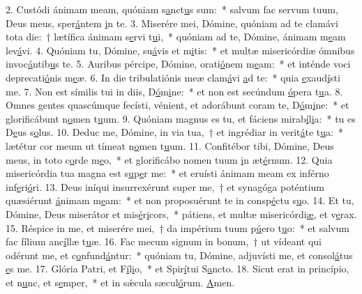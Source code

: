 2. Custódi ánimam meam, quóniam s\uline{a}nct\uline{u}s sum:~* salvum fac servum tuum, Deus meus, sper\uline{á}ntem \uline{i}n te.
3. Miserére mei, Dómine, quóniam ad te clamávi tota die:~† lætífica ánimam s\uline{e}rvi t\uline{u}i,~* quóniam ad te, Dómine, ánimam m\uline{e}am lev\uline{á}vi.
4. Quóniam tu, Dómine, su\uline{á}vis et m\uline{i}tis:~* et multæ misericórdiæ ómnibus invoc\uline{á}ntib\uline{u}s te.
5. Auribus pércipe, Dómine, orati\uline{ó}nem m\uline{e}am:~* et inténde voci deprecati\uline{ó}nis m\uline{e}æ.
6. In die tribulatiónis meæ clam\uline{á}vi \uline{a}d te:~* quia \uline{e}xaud\uline{í}sti me.
7. Non est símilis tui in diis, D\uline{ó}m\uline{i}ne:~* et non est secúndum \uline{ó}pera t\uline{u}a.
8. Omnes gentes quascúmque fecísti, vénient, et adorábunt coram te, D\uline{ó}m\uline{i}ne:~* et glorificábunt n\uline{o}men t\uline{u}um.
9. Quóniam magnus es tu, et fáciens mirab\uline{í}l\uline{i}a:~* tu es D\uline{e}us s\uline{o}lus.
10. Deduc me, Dómine, in via tua,~† et ingrédiar in verit\uline{á}te t\uline{u}a:~* lætétur cor meum ut tímeat n\uline{o}men t\uline{u}um.
11. Confitébor tibi, Dómine, Deus meus, in toto c\uline{o}rde m\uline{e}o,~* et glorificábo nomen tuum \uline{i}n æt\uline{é}rnum.
12. Quia misericórdia tua magna est s\uline{u}p\uline{e}r me:~* et eruísti ánimam meam ex inférno inf\uline{e}ri\uline{ó}ri.
13. Deus iníqui insurrexérunt super me,~† et synagóga poténtium quæsiérunt \uline{á}nimam m\uline{e}am:~* et non proposuérunt te in consp\uline{é}ctu s\uline{u}o.
14. Et tu, Dómine, Deus miserátor et mis\uline{é}r\uline{i}cors,~* pátiens, et multæ misericórdi\uline{æ}, et v\uline{e}rax.
15. Réspice in me, et miserére mei,~† da impérium tuum p\uline{ú}ero t\uline{u}o:~* et salvum fac fílium anc\uline{í}llæ t\uline{u}æ.
16. Fac mecum signum in bonum,~† ut vídeant qui odérunt me, et c\uline{o}nfund\uline{á}ntur:~* quóniam tu, Dómine, adjuvísti me, et consol\uline{á}tus \uline{e}s me.
17. Glória Patri, et F\uline{í}l\uline{i}o,~* et Spir\uline{í}tui S\uline{a}ncto.
18. Sicut erat in princípio, et n\uline{u}nc, et s\uline{e}mper,~* et in sǽcula sæcul\uline{ó}rum. \uline{A}men.
